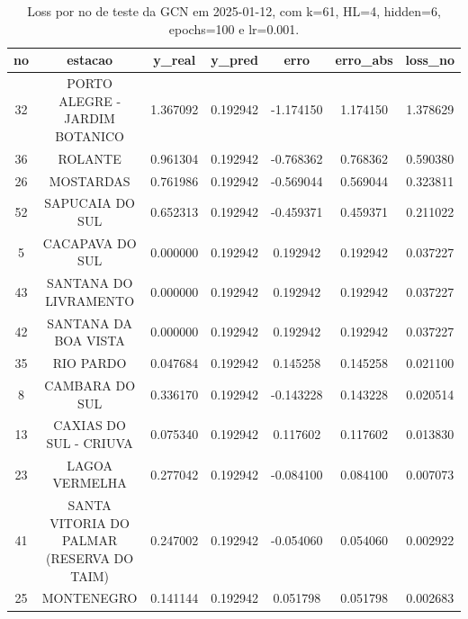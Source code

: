 \begin{table}[h]
\centering
\caption{Loss por no de teste da GCN em 2025-01-12, com k=61, HL=4, hidden=6, epochs=100 e lr=0.001.}
\label{tab:gcn_loss_k61_hl4_h6_e100_d20250112}
\begin{tabular}{ccccccc}
\toprule
no & estacao & y\_real & y\_pred & erro & erro\_abs & loss\_no \\
\midrule
32 & PORTO ALEGRE - JARDIM BOTANICO & 1.367092 & 0.192942 & -1.174150 & 1.174150 & 1.378629 \\
36 & ROLANTE & 0.961304 & 0.192942 & -0.768362 & 0.768362 & 0.590380 \\
26 & MOSTARDAS & 0.761986 & 0.192942 & -0.569044 & 0.569044 & 0.323811 \\
52 & SAPUCAIA DO SUL & 0.652313 & 0.192942 & -0.459371 & 0.459371 & 0.211022 \\
5 & CACAPAVA DO SUL & 0.000000 & 0.192942 & 0.192942 & 0.192942 & 0.037227 \\
43 & SANTANA DO LIVRAMENTO & 0.000000 & 0.192942 & 0.192942 & 0.192942 & 0.037227 \\
42 & SANTANA DA BOA VISTA & 0.000000 & 0.192942 & 0.192942 & 0.192942 & 0.037227 \\
35 & RIO PARDO & 0.047684 & 0.192942 & 0.145258 & 0.145258 & 0.021100 \\
8 & CAMBARA DO SUL & 0.336170 & 0.192942 & -0.143228 & 0.143228 & 0.020514 \\
13 & CAXIAS DO SUL - CRIUVA & 0.075340 & 0.192942 & 0.117602 & 0.117602 & 0.013830 \\
23 & LAGOA VERMELHA & 0.277042 & 0.192942 & -0.084100 & 0.084100 & 0.007073 \\
41 & SANTA VITORIA DO PALMAR (RESERVA DO TAIM) & 0.247002 & 0.192942 & -0.054060 & 0.054060 & 0.002922 \\
25 & MONTENEGRO & 0.141144 & 0.192942 & 0.051798 & 0.051798 & 0.002683 \\
\bottomrule
\end{tabular}
\end{table}
